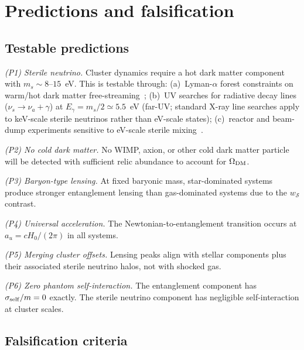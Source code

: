 \documentclass[aps,prd,twocolumn,superscriptaddress,nofootinbib]{revtex4-2}
\newcommand{\au}{a_u}
\newcommand{\wS}{w_{\mathcal{S}}}
\begin{document}
\section{Predictions and falsification}
\label{sec:predictions}

\subsection{Testable predictions}

\textit{(P1) Sterile neutrino.} Cluster dynamics require a hot dark matter component with $m_s\sim 8$--$15$~eV. This is testable through: (a)~Lyman-$\alpha$ forest constraints on warm/hot dark matter free-streaming~\cite{Boyarsky2019}; (b)~UV searches for radiative decay lines ($\nu_s\to\nu_a+\gamma$) at $E_\gamma=m_s/2\simeq 5.5$~eV (far-UV; standard X-ray line searches apply to keV-scale sterile neutrinos rather than eV-scale states); (c)~reactor and beam-dump experiments sensitive to eV-scale sterile mixing~\cite{Dasgupta2021}.

\textit{(P2) No cold dark matter.} No WIMP, axion, or other cold dark matter particle will be detected with sufficient relic abundance to account for $\Omega_{\rm DM}$.

\textit{(P3) Baryon-type lensing.} At fixed baryonic mass, star-dominated systems produce stronger entanglement lensing than gas-dominated systems due to the $\wS$ contrast.

\textit{(P4) Universal acceleration.} The Newtonian-to-entanglement transition occurs at $\au=cH_0/(2\pi)$ in all systems.

\textit{(P5) Merging cluster offsets.} Lensing peaks align with stellar components plus their associated sterile neutrino halos, not with shocked gas.

\textit{(P6) Zero phantom self-interaction.} The entanglement component has $\sigma_{\rm self}/m=0$ exactly. The sterile neutrino component has negligible self-interaction at cluster scales.

\subsection{Falsification criteria}
\end{document}
